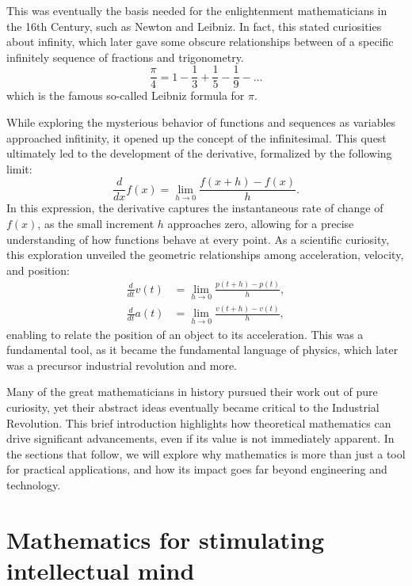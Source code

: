 \documentclass[10pt,conference]{IEEEtran}
\begin{document}
\begin{sloppy}
This was eventually the basis needed for the enlightenment mathematicians in the 16th Century, such as Newton and Leibniz. In fact, this stated curiosities about infinity, which later gave some obscure relationships between of a specific
infinitely sequence of fractions and trigonometry.
\begin{equation}
    \frac{\pi}{4} = 1 - \frac{1}{3} + \frac{1}{5} - \frac{1}{9}- \ldots
\end{equation}
which is the famous so-called Leibniz formula for $\pi $.

While exploring the mysterious behavior of functions and sequences as variables approached infitinity, it opened up the concept of the infinitesimal. This quest ultimately led to the development of the derivative, formalized by the following limit:
\begin{equation}
    \frac{d}{dx} f(x) = \lim_{h \to 0} \frac{f(x+h) - f(x)}{h}.
\end{equation}
In this expression, the derivative captures the instantaneous rate of change of \( f(x) \), as the small increment \( h \) approaches zero, allowing for a precise understanding of how functions behave at every point.
As a scientific curiosity, this exploration unveiled the geometric relationships among acceleration, velocity, and position:
\begin{equation} \begin{split}
\frac{d}{dt} v(t) & = \lim_{h \to 0} \frac{p(t+h) - p(t)}{h}, \\
\frac{d}{dt} a(t) & = \lim_{h \to 0} \frac{v(t+h) - v(t)}{h},
\end{split} \end{equation}
 enabling to relate the position of an object to its acceleration. This was a fundamental tool, as it became the fundamental language of physics, which later was a precursor industrial revolution and more.

Many of the great mathematicians in history pursued their work out of pure curiosity, yet their abstract ideas eventually became critical to the Industrial Revolution. This brief introduction highlights how theoretical mathematics can drive significant advancements, even if its value is not immediately apparent. In the sections that follow, we will explore why mathematics is more than just a tool for practical applications, and how its impact goes far beyond engineering and technology.


\newpage
\section{Mathematics for stimulating intellectual mind}%
\label{sec:mathematics_for_stimulating_intellectual_mind}


\end{sloppy}
\end{document}

